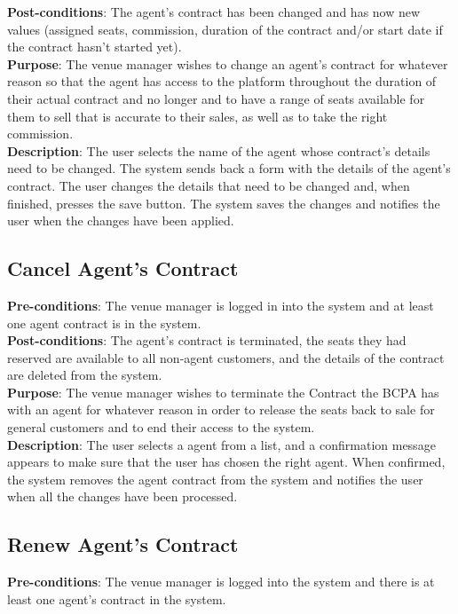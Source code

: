 \textbf{Post-conditions}: The agent's contract has been changed and
has now new values (assigned seats, commission, duration of the
contract and/or start date if the contract hasn't started yet).\\

\textbf{Purpose}: The venue manager wishes to change an agent's
contract for whatever reason so that the agent has access to the
platform throughout the duration of their actual contract and no
longer and to have a range of seats available for them to sell that
is accurate to their sales, as well as to take the right commission.\\

\textbf{Description}: The user selects the name of the agent whose
contract's details need to be changed. The system sends back a form
with the details of the agent's contract. The user changes the details
that need to be changed and, when finished, presses the save button.
The system saves the changes and notifies the user when the changes
have been applied.

\subsection{Cancel Agent's Contract}
\textbf{Pre-conditions}: The venue manager is logged in into the
system and at least one agent contract is in the system.\\

\textbf{Post-conditions}: The agent's contract is terminated,
the seats they had reserved are available to all non-agent
customers, and the details of the contract are deleted from
the system.\\

\textbf{Purpose}: The venue manager wishes to terminate the Contract
the BCPA has with an agent for whatever reason in order to release
the seats back to sale for general customers and to end their access
to the system.\\

\textbf{Description}: The user selects a agent from a list,
and a confirmation message appears to make sure that the
user has chosen the right agent. When confirmed, the system
removes the agent contract from the system and notifies
the user when all the changes have been processed.

\subsection{Renew Agent's Contract}
\textbf{Pre-conditions}: The venue manager is logged into the system
and there is at least one agent's contract in the system.\\

